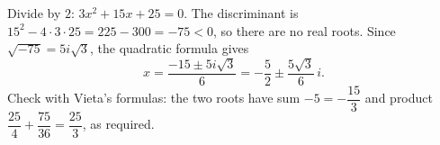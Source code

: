 Divide by $2$: $3x^2+15x+25=0$. The discriminant is $15^2-4\cdot3\cdot25=225-300=-75<0$, so there are no real roots. Since $\sqrt{-75}=5i\sqrt3$, the quadratic formula gives
\[
x=\dfrac{-15\pm5i\sqrt3}{6}=\boxed{-\dfrac{5}{2}\pm\dfrac{5\sqrt3}{6}\,i}.
\]
Check with Vieta's formulas: the two roots have sum $-5=-\dfrac{15}{3}$ and product $\dfrac{25}{4}+\dfrac{75}{36}=\dfrac{25}{3}$, as required.

